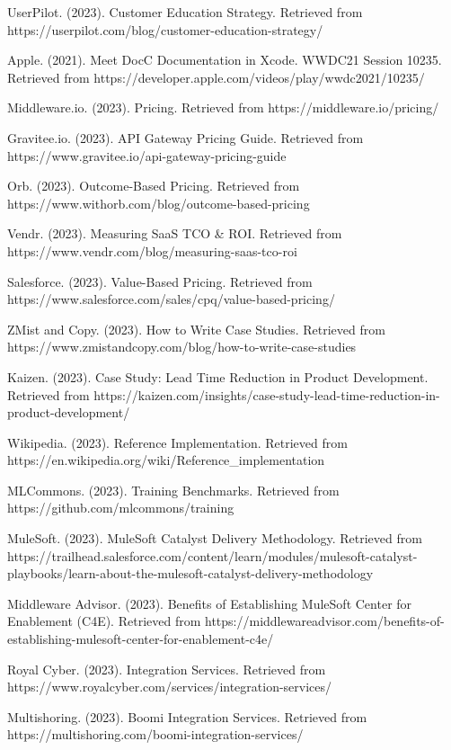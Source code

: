 \documentclass[11pt,a4paper]{article}
\begin{document}
\begin{thebibliography}{99}
 UserPilot. (2023). Customer Education Strategy. Retrieved from https://userpilot.com/blog/customer-education-strategy/

 Apple. (2021). Meet DocC Documentation in Xcode. WWDC21 Session 10235. Retrieved from https://developer.apple.com/videos/play/wwdc2021/10235/

 Middleware.io. (2023). Pricing. Retrieved from https://middleware.io/pricing/

 Gravitee.io. (2023). API Gateway Pricing Guide. Retrieved from https://www.gravitee.io/api-gateway-pricing-guide

 Orb. (2023). Outcome-Based Pricing. Retrieved from https://www.withorb.com/blog/outcome-based-pricing

 Vendr. (2023). Measuring SaaS TCO \& ROI. Retrieved from https://www.vendr.com/blog/measuring-saas-tco-roi

 Salesforce. (2023). Value-Based Pricing. Retrieved from https://www.salesforce.com/sales/cpq/value-based-pricing/

 ZMist and Copy. (2023). How to Write Case Studies. Retrieved from https://www.zmistandcopy.com/blog/how-to-write-case-studies

 Kaizen. (2023). Case Study: Lead Time Reduction in Product Development. Retrieved from https://kaizen.com/insights/case-study-lead-time-reduction-in-product-development/

 Wikipedia. (2023). Reference Implementation. Retrieved from https://en.wikipedia.org/wiki/Reference\_implementation

 MLCommons. (2023). Training Benchmarks. Retrieved from https://github.com/mlcommons/training

 MuleSoft. (2023). MuleSoft Catalyst Delivery Methodology. Retrieved from https://trailhead.salesforce.com/content/learn/modules/mulesoft-catalyst-playbooks/learn-about-the-mulesoft-catalyst-delivery-methodology

 Middleware Advisor. (2023). Benefits of Establishing MuleSoft Center for Enablement (C4E). Retrieved from https://middlewareadvisor.com/benefits-of-establishing-mulesoft-center-for-enablement-c4e/

 Royal Cyber. (2023). Integration Services. Retrieved from https://www.royalcyber.com/services/integration-services/

 Multishoring. (2023). Boomi Integration Services. Retrieved from https://multishoring.com/boomi-integration-services/

\end{thebibliography}



\end{document}

